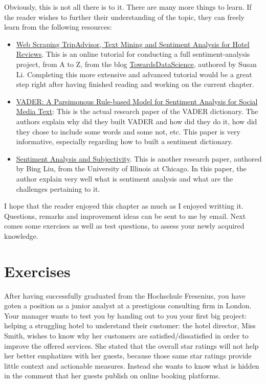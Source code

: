 	Obviously, this is not all there is to it. There are many more things to learn. If the reader wishes to further their understanding of the topic, they can freely learn from the following resources:
	\begin{itemize}
		\item \href{https://towardsdatascience.com/scraping-tripadvisor-text-mining-and-sentiment-analysis-for-hotel-reviews-cc4e20aef333}{Web Scraping TripAdvisor, Text Mining and Sentiment Analysis for Hotel Reviews}. This is an online tutorial for conducting a full sentiment-analysis project, from A to Z, from the blog \href{https://towardsdatascience.com/}{TowardsDataScience}, authored by Susan Li. Completing this more extensive and advanced tutorial would be a great step right after having finished reading and working on the current chapter.
		\item \href{http://comp.social.gatech.edu/papers/icwsm14.vader.hutto.pdf}{VADER: A Parsimonous Rule-based Model for Sentiment Analysis for Social Media Text}: This is the actual research paper of the VADER dictionary. The authors explain why did they built VADER and how did they do it, how did they chose to include some words and some not, etc. This paper is very informative, especially regarding how to built a sentiment dictionary.
		\item \href{https://www.cs.uic.edu/~liub/FBS/NLP-handbook-sentiment-analysis.pdf}{Sentiment Analysis and Subjectivity}. This is another research paper, authored by Bing Liu, from the University of Illinois at Chicago. In this paper, the author explain very well what is sentiment analysis and what are the challenges pertaining to it.
	\end{itemize}

	I hope that the reader enjoyed this chapter as much as I enjoyed writting it. Questions, remarks and improvement ideas can be sent to me by email. Next comes some exercises as well as test questions, to assess your newly acquired knowledge.

	\section{Exercises}
	After having successfully graduated from the Hochschule Fresenius, you have goten a position as a junior analyst at a prestigious consulting firm in London. Your manager wants to test you by handing out to you your first big project: helping a struggling hotel to understand their customer: the hotel director, Miss Smith, wishes to know why her customers are satisfied/dissatisfied in order to improve the offered services. She stated that the overall star ratings will not help her better emphatizes with her guests, because those same star ratings provide little context and actionable measures. Instead she wants to know what is hidden in the comment that her guests publish on online booking platforms.
	
